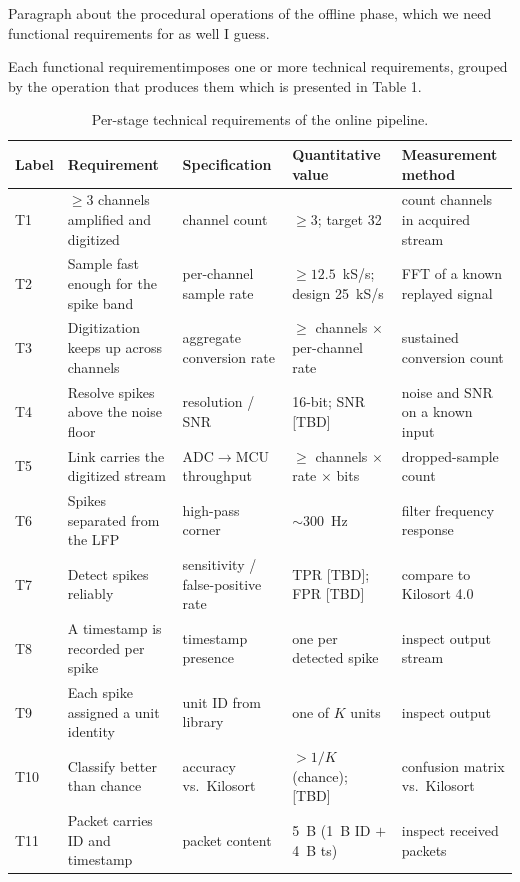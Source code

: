 \documentclass[11pt]{article}
\begin{document}
Paragraph about the procedural operations of the offline phase, which we need functional 
requirements for as well I guess.

Each functional requirementimposes one or more technical requirements, grouped by the 
operation that produces them which is presented in Table 1.

\begin{table}[h]
\centering
\caption{Per-stage technical requirements of the online pipeline.}
\label{tab:perstage}
{\footnotesize
\setlength{\tabcolsep}{4pt}
\renewcommand{\arraystretch}{1.25}
\begin{tabularx}{\textwidth}{@{}l L L L L@{}}
\toprule
Label & Requirement & Specification & Quantitative value & Measurement method \\
\midrule
T1  & $\geq 3$ channels amplified and digitized & channel count & $\geq 3$; target 32 & count channels in acquired stream \\
T2  & Sample fast enough for the spike band & per-channel sample rate & $\geq 12.5$~kS/s; design 25~kS/s & FFT of a known replayed signal \\
T3  & Digitization keeps up across channels & aggregate conversion rate & $\geq$ channels $\times$ per-channel rate & sustained conversion count \\
T4  & Resolve spikes above the noise floor & resolution / SNR & 16-bit; SNR [TBD] & noise and SNR on a known input \\
T5  & Link carries the digitized stream & ADC$\to$MCU throughput & $\geq$ channels $\times$ rate $\times$ bits & dropped-sample count \\
T6  & Spikes separated from the LFP & high-pass corner & $\sim$300~Hz & filter frequency response \\
T7  & Detect spikes reliably & sensitivity / false-positive rate & TPR [TBD]; FPR [TBD] & compare to Kilosort 4.0 \\
T8  & A timestamp is recorded per spike & timestamp presence & one per detected spike & inspect output stream \\
T9  & Each spike assigned a unit identity & unit ID from library & one of $K$ units & inspect output \\
T10 & Classify better than chance & accuracy vs.\ Kilosort & $> 1/K$ (chance); [TBD] & confusion matrix vs.\ Kilosort \\
T11 & Packet carries ID and timestamp & packet content & 5~B (1~B ID $+$ 4~B ts) & inspect received packets \\
\bottomrule
\end{tabularx}
}
\end{table}
\end{document}
